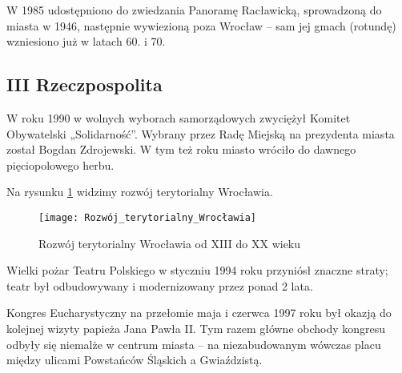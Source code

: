 \documentclass{article}
\begin{document}
\vspace{6pt}

\noindent W 1985 udostępniono do zwiedzania Panoramę Racławicką, sprowadzoną do miasta w 1946, następnie wywiezioną poza Wrocław – sam jej gmach (rotundę) wzniesiono już w latach 60. i 70.

\subsection*{III Rzeczpospolita}

W roku 1990 w wolnych wyborach samorządowych zwyciężył Komitet Obywatelski „Solidarność”. Wybrany przez Radę Miejską na prezydenta miasta został Bogdan Zdrojewski. W tym też roku miasto wróciło do dawnego pięciopolowego herbu.

\vspace{6pt}

\noindent Na rysunku \ref{rysunek14} widzimy rozwój terytorialny Wrocławia.
\begin{figure}[h]
\centering

\texttt{[image: Rozwój\_terytorialny\_Wrocławia]}
\caption{Rozwój terytorialny Wrocławia od XIII do XX wieku}
\label{rysunek14}
\end{figure}

\vspace{6pt}

\noindent Wielki pożar Teatru Polskiego w styczniu 1994 roku przyniósł znaczne straty; teatr był odbudowywany i modernizowany przez ponad 2 lata.

\vspace{6pt}

\noindent Kongres Eucharystyczny na przełomie maja i czerwca 1997 roku był okazją do kolejnej wizyty papieża Jana Pawła II. Tym razem główne obchody kongresu odbyły się niemalże w centrum miasta – na niezabudowanym wówczas placu między ulicami Powstańców Śląskich a Gwiaździstą.
\end{document}
